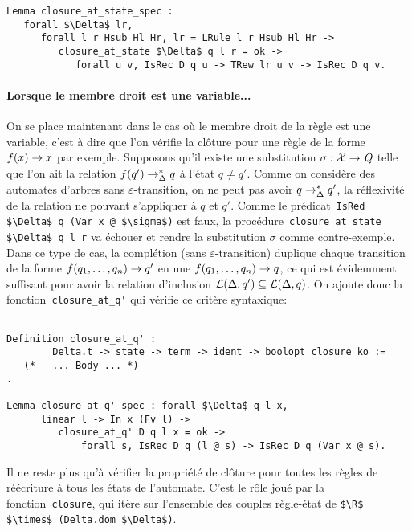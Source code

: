 \begin{lstlisting}
Lemma closure_at_state_spec : 
   forall $\Delta$ lr, 
      forall l r Hsub Hl Hr, lr = LRule l r Hsub Hl Hr ->
         closure_at_state $\Delta$ q l r = ok ->
            forall u v, IsRec D q u -> TRew lr u v -> IsRec D q v.
\end{lstlisting}


\paragraph{Lorsque le membre droit est une variable...}
\label{par:si-le-membre}
On se place maintenant dans le cas où le membre droit de la règle est une variable, c'est à dire que l'on vérifie 
la clôture pour une règle de la forme $f(x) \rightarrow x$ par exemple. Supposons qu'il existe une substitution $\sigma : \mathcal X \rightarrow \mathit Q$
telle que l'on ait la relation $f(q') \rightarrow_\Delta^* q$ à l'état $q \not= q'$. Comme on considère des automates d'arbres sans $\varepsilon$-transition,
on ne peut pas avoir $q \rightarrow^*_\Delta q'$, la réflexivité de la relation ne pouvant s'appliquer à $q$ et $q'$.
Comme le prédicat~\lstinline!IsRed $\Delta$ q (Var x @ $\sigma$)! est faux, la procédure~\lstinline!closure_at_state $\Delta$ q l r!
va échouer et rendre la substitution $\sigma$ comme contre-exemple. 
Dans ce type de cas, la complétion (sans $\varepsilon$-transition) duplique chaque transition de la forme $f(q_1,\dots,q_n) \rightarrow q'$ en une $f(q_1,\dots,q_n) \rightarrow q$,
ce qui est évidemment suffisant pour avoir la relation d'inclusion $\mathcal{L}(\Delta, q') \subseteq \mathcal{L}(\Delta, q)$.
On ajoute donc la fonction~\lstinline!closure_at_q'! qui vérifie ce critère syntaxique:

\begin{lstlisting}

Definition closure_at_q' :
        Delta.t -> state -> term -> ident -> boolopt closure_ko :=
   (*   ... Body ... *)
.

Lemma closure_at_q'_spec : forall $\Delta$ q l x,
      linear l -> In x (Fv l) ->
         closure_at_q' D q l x = ok ->
             forall s, IsRec D q (l @ s) -> IsRec D q (Var x @ s).
\end{lstlisting}


Il ne reste plus qu'à vérifier la propriété de clôture pour toutes les règles de réécriture 
à tous les états de l'automate. C'est le rôle joué par la fonction~\lstinline!closure!,
qui itère sur l'ensemble des couples règle-état de \lstinline!$\R$ $\times$ (Delta.dom $\Delta$)!.

